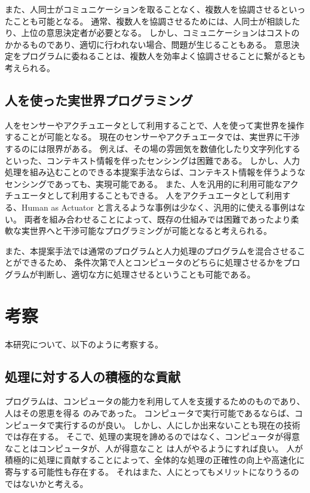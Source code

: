 \documentclass[twoside]{wiss}
\begin{document}
また、人同士がコミュニケーションを取ることなく、複数人を協調させるといったことも可能となる。
通常、複数人を協調させるためには、人同士が相談したり、上位の意思決定者が必要となる。
しかし、コミュニケーションはコストのかかるものであり、適切に行われない場合、問題が生じることもある。
意思決定をプログラムに委ねることは、複数人を効率よく協調させることに繋がるとも考えられる。


\subsection{人を使った実世界プログラミング}

人をセンサーやアクチュエータとして利用することで、人を使って実世界を操作することが可能となる。
現在のセンサーやアクチュエータでは、実世界に干渉するのには限界がある。
例えば、その場の雰囲気を数値化したり文字列化するといった、コンテキスト情報を伴ったセンシングは困難である。
しかし、人力処理を組み込むことのできる本提案手法ならば、コンテキスト情報を伴うようなセンシングであっても、実現可能である。
また、人を汎用的に利用可能なアクチュエータとして利用することもできる。
人をアクチュエータとして利用する、Human as Actuator と言えるような事例は少なく、汎用的に使える事例はない。
両者を組み合わせることによって、既存の仕組みでは困難であったより柔軟な実世界へと干渉可能なプログラミングが可能となると考えられる。

また、本提案手法では通常のプログラムと人力処理のプログラムを混合させることができるため、
条件次第で人とコンピュータのどちらに処理させるかをプログラムが判断し、適切な方に処理させるということも可能である。


\section{考察}

本研究について、以下のように考察する。

\subsection{処理に対する人の積極的な貢献}
プログラムは、コンピュータの能力を利用して人を支援するためのものであり、人はその恩恵を得る
のみであった。
コンピュータで実行可能であるならば、コンピュータで実行するのが良い。
しかし、人にしか出来ないことも現在の技術では存在する。
そこで、処理の実現を諦めるのではなく、コンピュータが得意なことはコンピュータが、人が得意なこと
は人がやるようにすれば良い。
人が積極的に処理に貢献することによって、全体的な処理の正確性の向上や高速化に寄与する可能性も存在する。
それはまた、人にとってもメリットになりうるのではないかと考える。
\end{document}

